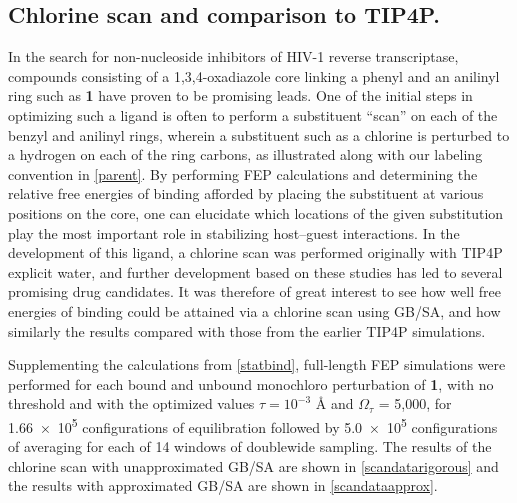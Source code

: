 \documentclass[12pt]{report}
\begin{document}
\subsection{Chlorine scan and comparison to TIP4P.}

In the search for non-nucleoside inhibitors of HIV-1 reverse transcriptase, compounds consisting of a 1,3,4-oxadiazole core linking a phenyl and an anilinyl ring such as \textbf{1} have proven to be promising leads. One of the initial steps in optimizing such a ligand is often to perform a substituent ``scan'' on each of the benzyl and anilinyl rings, wherein a substituent such as a chlorine is perturbed to a hydrogen on each of the ring carbons, as illustrated along with our labeling convention in \cref{parent}. By performing FEP calculations and determining the relative free energies of binding afforded by placing the substituent at various positions on the core, one can elucidate which locations of the given substitution play the most important role in stabilizing host--guest interactions. In the development of this ligand, a chlorine scan was performed originally with TIP4P explicit water, \cite{tipscan} and further development based on these studies has led to several promising drug candidates.\cite{tipopt} It was therefore of great interest to see how well free energies of binding could be attained via a chlorine scan using GB/SA, and how similarly the results compared with those from the earlier TIP4P simulations. 

Supplementing the calculations from \cref{statbind}, full-length FEP simulations were performed for each bound and unbound monochloro perturbation of \textbf{1}, with no threshold and with the optimized values $\tau = 10^{-3}$ \AA{} and $\Omega_\tau$ = 5,000, for \num{1.66e5} configurations of equilibration followed by \num{5.0e5} configurations of averaging for each of 14 windows of doublewide sampling. The results of the chlorine scan with unapproximated GB/SA are shown in \cref{scandatarigorous} and the results with approximated GB/SA are shown in \cref{scandataapprox}.
\end{document}
